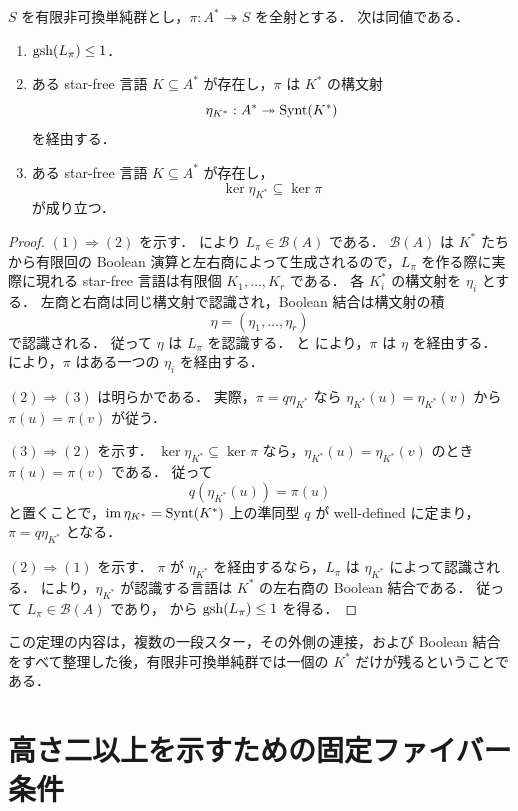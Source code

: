 \begin{theorem}[単一観測器還元]\label{thm:single-observer}
$S$ を有限非可換単純群とし，$\pi:A^*\twoheadrightarrow S$ を全射とする．
次は同値である．
\begin{enumerate}
\item $\operatorname{gsh}(L_\pi)\leq1$．
\item ある star-free 言語 $K\subseteq A^*$ が存在し，$\pi$ は $K^*$ の構文射
\[
\eta_{K^*}:A^*\twoheadrightarrow\operatorname{Synt}(K^*)
\]
を経由する．
\item ある star-free 言語 $K\subseteq A^*$ が存在し，
\[
\ker\eta_{K^*}\subseteq\ker\pi
\]
が成り立つ．
\end{enumerate}
\end{theorem}

\begin{proof}
$(1)\Rightarrow(2)$ を示す．
 により $L_\pi\in\mathcal B(A)$ である．
$\mathcal B(A)$ は $K^*$ たちから有限回の Boolean 演算と左右商によって生成されるので，$L_\pi$ を作る際に実際に現れる star-free 言語は有限個 $K_1,\dots,K_r$ である．
各 $K_i^*$ の構文射を $\eta_i$ とする．
左商と右商は同じ構文射で認識され，Boolean 結合は構文射の積
\[
\eta=(\eta_1,\dots,\eta_r)
\]
で認識される．
従って $\eta$ は $L_\pi$ を認識する．
 と  により，$\pi$ は $\eta$ を経由する．
 により，$\pi$ はある一つの $\eta_i$ を経由する．

$(2)\Rightarrow(3)$ は明らかである．
実際，$\pi=q\eta_{K^*}$ なら $\eta_{K^*}(u)=\eta_{K^*}(v)$ から $\pi(u)=\pi(v)$ が従う．

$(3)\Rightarrow(2)$ を示す．
$\ker\eta_{K^*}\subseteq\ker\pi$ なら，$\eta_{K^*}(u)=\eta_{K^*}(v)$ のとき $\pi(u)=\pi(v)$ である．
従って
\[
q(\eta_{K^*}(u))=\pi(u)
\]
と置くことで，$\operatorname{im}\eta_{K^*}=\operatorname{Synt}(K^*)$ 上の準同型 $q$ が well-defined に定まり，$\pi=q\eta_{K^*}$ となる．

$(2)\Rightarrow(1)$ を示す．
$\pi$ が $\eta_{K^*}$ を経由するなら，$L_\pi$ は $\eta_{K^*}$ によって認識される．
 により，$\eta_{K^*}$ が認識する言語は $K^*$ の左右商の Boolean 結合である．
従って $L_\pi\in\mathcal B(A)$ であり， から $\operatorname{gsh}(L_\pi)\leq1$ を得る．
\end{proof}

この定理の内容は，複数の一段スター，その外側の連接，および Boolean 結合をすべて整理した後，有限非可換単純群では一個の $K^*$ だけが残るということである．

\section{高さ二以上を示すための固定ファイバー条件}


